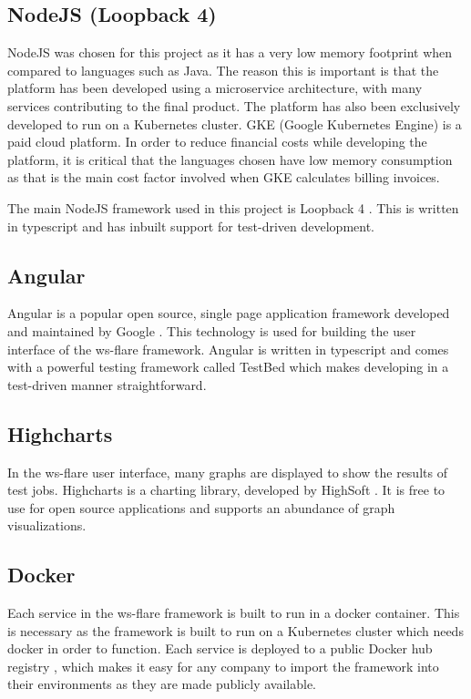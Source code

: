 \subsection{NodeJS (Loopback 4)}

NodeJS was chosen for this project as it has a very low memory footprint when compared to languages such as Java. The reason this is important is that the platform has been developed using a microservice architecture, with many services contributing to the final product. The platform has also been exclusively developed to run on a Kubernetes cluster. GKE (Google Kubernetes Engine) is a paid cloud platform. In order to reduce financial costs while developing the platform, it is critical that the languages chosen have low memory consumption as that is the main cost factor involved when GKE calculates billing invoices.

The main NodeJS framework used in this project is Loopback 4 \cite{loopback4}. This is written in typescript and has inbuilt support for test-driven development.

\subsection{Angular}

Angular is a popular open source, single page application framework developed and maintained by Google \cite{angular}. This technology is used for building the user interface of the ws-flare framework. Angular is written in typescript and comes with a powerful testing framework called TestBed which makes developing in a test-driven manner straightforward.

\subsection{Highcharts}

In the ws-flare user interface, many graphs are displayed to show the results of test jobs. Highcharts is a charting library, developed by HighSoft \cite{highcharts}. It is free to use for open source applications and supports an abundance of graph visualizations.

\subsection{Docker}

Each service in the ws-flare framework is built to run in a docker container. This is necessary as the framework is built to run on a Kubernetes cluster which needs docker in order to function. Each service is deployed to a public Docker hub registry \cite{dockerhub}, which makes it easy for any company to import the framework into their environments as they are made publicly available.


